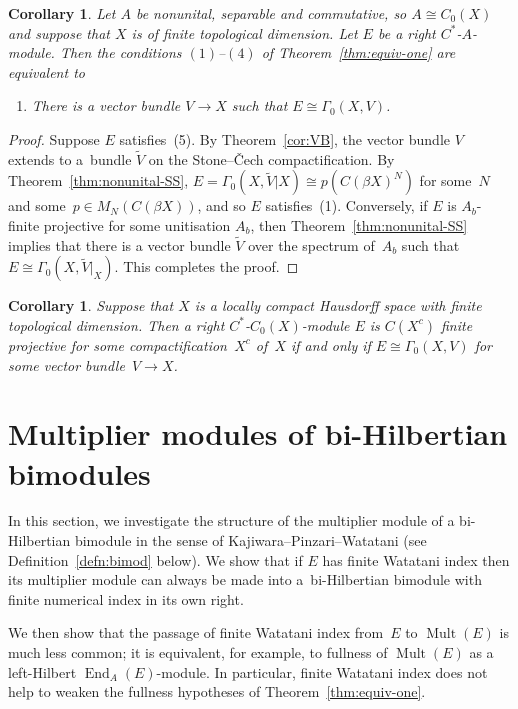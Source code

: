 \documentclass[10pt,a4paper]{amsart}
\numberwithin{equation}{section}
\newtheorem{corl}[thm]{Corollary}
 { \theoremstyle{definition}
\newtheorem{defn}[thm]{Definition}
\newtheorem{Example}[thm]{Example}
\newtheorem{rmk}[thm]{Remark}}
\DeclareMathOperator{\End}{End} %
\DeclareMathOperator{\Mult}{Mult} %
\begin{document}
\begin{corl}\label{thm:equiv-two} Let $A$ be nonunital, separable and commutative, so $A\cong C_0(X)$ and suppose that $X$ is of finite topological dimension. Let $E$ be a right $C^*$-$A$-module. Then the conditions $(1)$--$(4)$ of Theorem~{\rm \ref{thm:equiv-one}} are equivalent to
\begin{enumerate}\itemsep=0pt
\item[$5.$] There is a vector bundle $V\to X$ such that $E\cong \Gamma_0(X,V)$.
\end{enumerate}
\end{corl}

\begin{proof}
Suppose $E$ satisf\/ies~(5). By Theorem~\ref{cor:VB}, the vector bundle $V$ extends to a~bundle $\tilde{V}$ on the Stone--\v{C}ech compactif\/ication. By Theorem~\ref{thm:nonunital-SS}, $E=\Gamma_0(X,\tilde{V}|X)\cong p(C(\beta X)^N)$ for some~$N$ and some~$p\in M_N(C(\beta X))$, and so $E$ satisf\/ies~(1). Conversely, if $E$ is $A_b$-f\/inite projective for some unitisation $A_b$, then Theorem~\ref{thm:nonunital-SS} implies that there is a vector bundle $\tilde{V}$ over the spectrum of~$A_b$ such that $E\cong \Gamma_0(X,\tilde{V}|_X)$. This completes the proof.
\end{proof}

\begin{corl} Suppose that $X$ is a locally compact Hausdorff space with finite topological dimension. Then a right $C^*$-$C_0(X)$-module $E$ is $C(X^c)$ finite projective for some compactification~$X^c$ of~$X$ if and only if $E\cong\Gamma_0(X,V)$ for some vector bundle~$V\to X$.
\end{corl}

\section{Multiplier modules of bi-Hilbertian bimodules}

In this section, we investigate the structure of the multiplier module of a bi-Hilbertian bimodule in the sense of Kajiwara--Pinzari--Watatani (see Def\/inition~\ref{defn:bimod} below). We show that if $E$ has f\/inite Watatani index then its multiplier module can always be made into a~bi-Hilbertian bimodule with f\/inite numerical index in its own right.

We then show that the passage of f\/inite Watatani index from~$E$ to $\Mult(E)$ is much less common; it is equivalent, for example, to fullness of $\Mult(E)$ as a left-Hilbert $\End_{A}(E)$-module. In particular, f\/inite Watatani index does not help to weaken the fullness hypotheses of Theorem~\ref{thm:equiv-one}.
\end{document}
